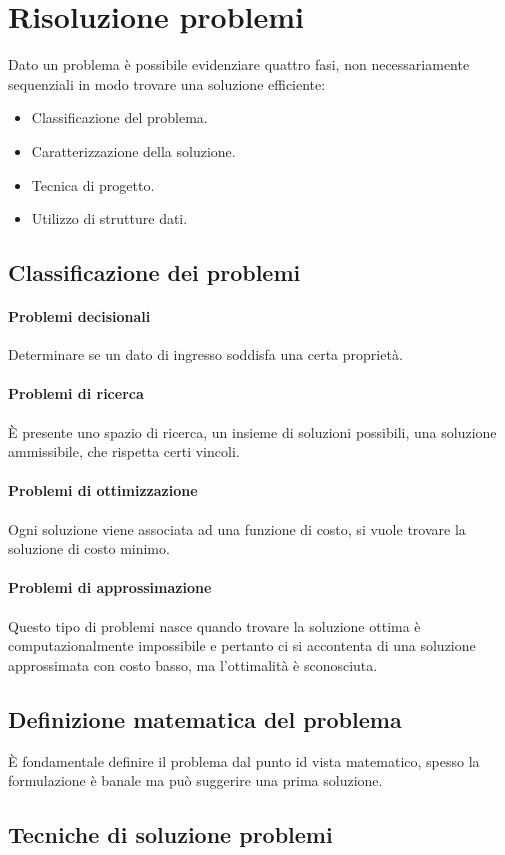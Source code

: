 \chapter{Risoluzione problemi}
Dato un problema \`e possibile evidenziare quattro fasi, non necessariamente sequenziali in modo trovare una soluzione efficiente:
\begin{itemize}
\item Classificazione del problema.
\item Caratterizzazione della soluzione.
\item Tecnica di progetto.
\item Utilizzo di strutture dati.
\end{itemize}
\section{Classificazione dei problemi}
\subsubsection{Problemi decisionali}
Determinare se un dato di ingresso soddisfa una certa propriet\`a.
\subsubsection{Problemi di ricerca}
\`E presente uno spazio di ricerca, un insieme di soluzioni possibili, una soluzione ammissibile, che rispetta certi vincoli.
\subsubsection{Problemi di ottimizzazione}
Ogni soluzione viene associata ad una funzione di costo, si vuole trovare la soluzione di costo minimo.
\subsubsection{Problemi di approssimazione}
Questo tipo di problemi nasce quando trovare la soluzione ottima \`e computazionalmente impossibile e pertanto ci si accontenta di una soluzione approssimata con costo basso, ma l'ottimalit\`a \`e sconosciuta.
\section{Definizione matematica del problema}
\`E fondamentale definire il problema dal punto id vista matematico, spesso la formulazione \`e banale ma pu\`o suggerire una prima soluzione. 
\section{Tecniche di soluzione problemi}
